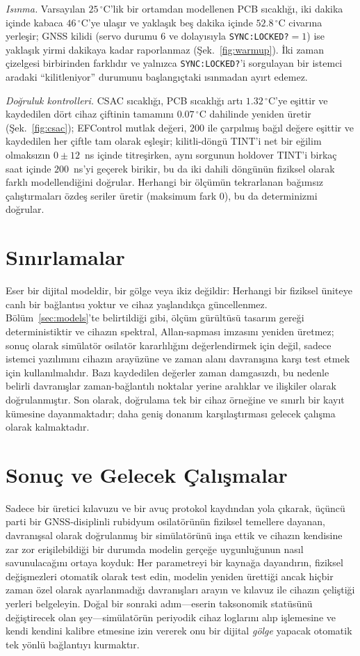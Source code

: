 \documentclass[conference]{IEEEtran}
\begin{document}
\emph{Isınma.} Varsayılan $25\,^\circ$C'lik bir ortamdan modellenen PCB sıcaklığı, iki dakika içinde kabaca $46\,^\circ$C'ye ulaşır ve yaklaşık beş dakika içinde $52.8\,^\circ$C civarına yerleşir; GNSS kilidi (servo durumu $6$ ve dolayısıyla \texttt{SYNC:LOCKED?}$=1$) ise yaklaşık yirmi dakikaya kadar raporlanmaz (Şek.~\ref{fig:warmup}). İki zaman çizelgesi birbirinden farklıdır ve yalnızca \texttt{SYNC:LOCKED?}'i sorgulayan bir istemci aradaki ``kilitleniyor'' durumunu başlangıçtaki ısınmadan ayırt edemez.

\emph{Doğruluk kontrolleri.} CSAC sıcaklığı, PCB sıcaklığı artı $1.32\,^\circ$C'ye eşittir ve kaydedilen dört cihaz çiftinin tamamını $0.07\,^\circ$C dahilinde yeniden üretir (Şek.~\ref{fig:csac}); EFControl mutlak değeri, $200$ ile çarpılmış bağıl değere eşittir ve kaydedilen her çiftle tam olarak eşleşir; kilitli-döngü TINT'i net bir eğilim olmaksızın $0 \pm 12$~ns içinde titreşirken, aynı sorgunun holdover TINT'i birkaç saat içinde $200$~ns'yi geçerek birikir, bu da iki dahili döngünün fiziksel olarak farklı modellendiğini doğrular. Herhangi bir ölçümün tekrarlanan bağımsız çalıştırmaları özdeş seriler üretir (maksimum fark $0$), bu da determinizmi doğrular.

\section{Sınırlamalar}
Eser bir dijital modeldir, bir gölge veya ikiz değildir: Herhangi bir fiziksel üniteye canlı bir bağlantısı yoktur ve cihaz yaşlandıkça güncellenmez. Bölüm~\ref{sec:models}'te belirtildiği gibi, ölçüm gürültüsü tasarım gereği deterministiktir ve cihazın spektral, Allan-sapması imzasını yeniden üretmez; sonuç olarak simülatör osilatör kararlılığını değerlendirmek için değil, sadece istemci yazılımını cihazın arayüzüne ve zaman alanı davranışına karşı test etmek için kullanılmalıdır. Bazı kaydedilen değerler zaman damgasızdı, bu nedenle belirli davranışlar zaman-bağlantılı noktalar yerine aralıklar ve ilişkiler olarak doğrulanmıştır. Son olarak, doğrulama tek bir cihaz örneğine ve sınırlı bir kayıt kümesine dayanmaktadır; daha geniş donanım karşılaştırması gelecek çalışma olarak kalmaktadır.

\section{Sonuç ve Gelecek Çalışmalar}
Sadece bir üretici kılavuzu ve bir avuç protokol kaydından yola çıkarak, üçüncü parti bir GNSS-disiplinli rubidyum osilatörünün fiziksel temellere dayanan, davranışsal olarak doğrulanmış bir simülatörünü inşa ettik ve cihazın kendisine zar zor erişilebildiği bir durumda modelin gerçeğe uygunluğunun nasıl savunulacağını ortaya koyduk: Her parametreyi bir kaynağa dayandırın, fiziksel değişmezleri otomatik olarak test edin, modelin yeniden ürettiği ancak hiçbir zaman özel olarak ayarlanmadığı davranışları arayın ve kılavuz ile cihazın çeliştiği yerleri belgeleyin. Doğal bir sonraki adım---eserin taksonomik statüsünü değiştirecek olan şey---simülatörün periyodik cihaz loglarını alıp işlemesine ve kendi kendini kalibre etmesine izin vererek onu bir dijital \emph{gölge} yapacak otomatik tek yönlü bağlantıyı kurmaktır.
\end{document}
